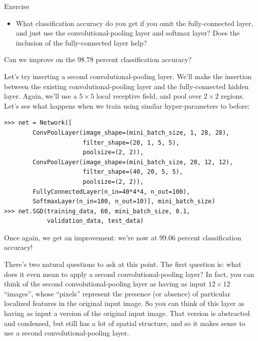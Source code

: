 \begin{exerciseBox}{Exercise}


\begin{itemize}

\item What classification accuracy do you get if you omit the fully-connected layer, and just use the convolutional-pooling layer and softmax layer? Does the inclusion of the fully-connected layer help?

\end{itemize}


Can we improve on the $98.78$ percent classification accuracy?


Let's try inserting a second convolutional-pooling layer. We'll make the insertion between the existing convolutional-pooling layer and the fully-connected hidden layer. Again, we'll use a $5 \times 5$ local receptive field, and pool over $2 \times 2$ regions. Let's see what happens when we train using similar hyper-parameters to before:



\begin{lstlisting}
>>> net = Network([
        ConvPoolLayer(image_shape=(mini_batch_size, 1, 28, 28), 
                      filter_shape=(20, 1, 5, 5), 
                      poolsize=(2, 2)),
        ConvPoolLayer(image_shape=(mini_batch_size, 20, 12, 12), 
                      filter_shape=(40, 20, 5, 5), 
                      poolsize=(2, 2)),
        FullyConnectedLayer(n_in=40*4*4, n_out=100),
        SoftmaxLayer(n_in=100, n_out=10)], mini_batch_size)
>>> net.SGD(training_data, 60, mini_batch_size, 0.1, 
            validation_data, test_data)        

\end{lstlisting}


Once again, we get an improvement: we're now at $99.06$ percent classification accuracy!


There's two natural questions to ask at this point. The first question is: what does it even mean to apply a second convolutional-pooling layer? In fact, you can think of the second convolutional-pooling layer as having as input $12 \times 12$ ``images'', whose ``pixels'' represent the presence (or absence) of particular localized features in the original input image. So you can think of this layer as having as input a version of the original input image. That version is abstracted and condensed, but still has a lot of spatial structure, and so it makes sense to use a second convolutional-pooling layer.



\end{exerciseBox}
